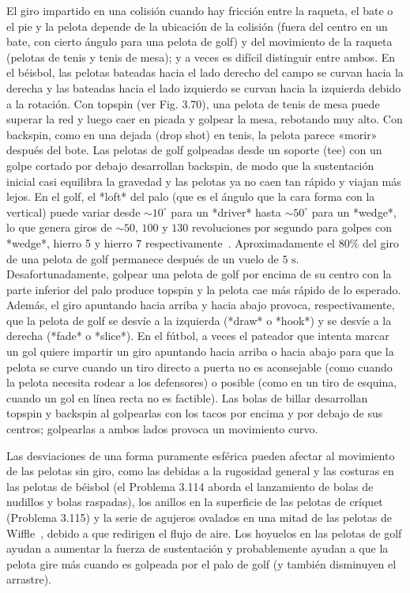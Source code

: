 \documentclass[12pt]{book}
\begin{document}
El giro impartido en una colisión cuando hay fricción entre la raqueta, el bate o el pie y la pelota depende de la ubicación de la colisión (fuera del centro en un bate, con cierto ángulo para una pelota de golf) y del movimiento de la raqueta (pelotas de tenis y tenis de mesa); y a veces es difícil distinguir entre ambos. En el béisbol, las pelotas bateadas hacia el lado derecho del campo se curvan hacia la derecha y las bateadas hacia el lado izquierdo se curvan hacia la izquierda debido a la rotación. Con topspin (ver Fig. 3.70), una pelota de tenis de mesa puede superar la red y luego caer en picada y golpear la mesa, rebotando muy alto. Con backspin, como en una dejada (drop shot) en tenis, la pelota parece «morir» después del bote. Las pelotas de golf golpeadas desde un soporte (tee) con un golpe cortado por debajo desarrollan backspin, de modo que la sustentación inicial casi equilibra la gravedad y las pelotas ya no caen tan rápido y viajan más lejos. En el golf, el *loft* del palo (que es el ángulo que la cara forma con la vertical) puede variar desde $\sim 10^\circ$ para un *driver* hasta $\sim 50^\circ$ para un *wedge*, lo que genera giros de $\sim 50$, $100$ y $130\text{ revoluciones por segundo}$ para golpes con *wedge*, hierro 5 y hierro 7 respectivamente~\cite{ref36}. Aproximadamente el $80\%$ del giro de una pelota de golf permanece después de un vuelo de $5\text{ s}$. Desafortunadamente, golpear una pelota de golf por encima de su centro con la parte inferior del palo produce topspin y la pelota cae más rápido de lo esperado. Además, el giro apuntando hacia arriba y hacia abajo provoca, respectivamente, que la pelota de golf se desvíe a la izquierda (*draw* o *hook*) y se desvíe a la derecha (*fade* o *slice*). En el fútbol, a veces el pateador que intenta marcar un gol quiere impartir un giro apuntando hacia arriba o hacia abajo para que la pelota se curve cuando un tiro directo a puerta no es aconsejable (como cuando la pelota necesita rodear a los defensores) o posible (como en un tiro de esquina, cuando un gol en línea recta no es factible). Las bolas de billar desarrollan topspin y backspin al golpearlas con los tacos por encima y por debajo de sus centros; golpearlas a ambos lados provoca un movimiento curvo.

Las desviaciones de una forma puramente esférica pueden afectar al movimiento de las pelotas sin giro, como las debidas a la rugosidad general y las costuras en las pelotas de béisbol (el Problema 3.114 aborda el lanzamiento de bolas de nudillos y bolas raspadas), los anillos en la superficie de las pelotas de críquet (Problema 3.115) y la serie de agujeros ovalados en una mitad de las pelotas de Wiffle~\cite{ref123}, debido a que redirigen el flujo de aire. Los hoyuelos en las pelotas de golf ayudan a aumentar la fuerza de sustentación y probablemente ayudan a que la pelota gire más cuando es golpeada por el palo de golf (y también disminuyen el arrastre).
\end{document}
